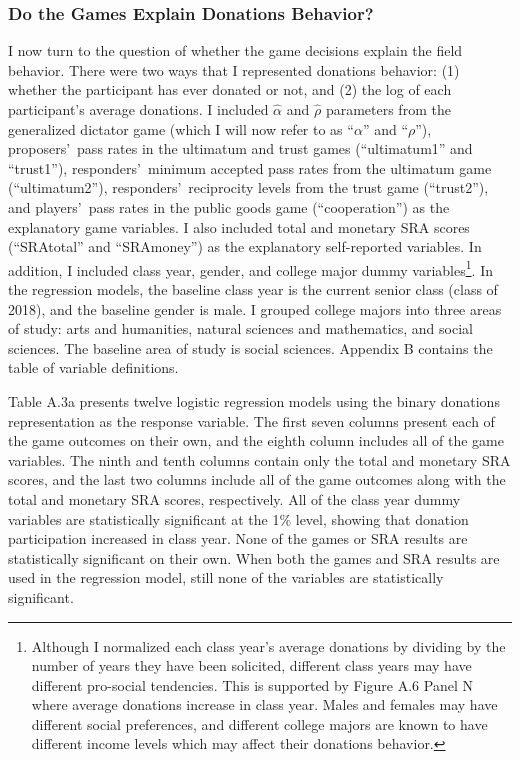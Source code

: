 \documentclass[12pt]{article}
\begin{document}
\subsubsection{Do the Games Explain Donations Behavior?}
I now turn to the question of whether the game decisions explain the field behavior. There were two ways that I represented donations behavior: (1) whether the participant has ever donated or not, and (2) the log of each participant\rq s average donations. I included \(\hat{\alpha}\) and \(\hat{\rho}\) parameters from the generalized dictator game (which I will now refer to as ``\(\alpha\)'' and ``\(\rho\)''), proposers\rq \ pass rates in the ultimatum and trust games (``ultimatum1'' and ``trust1''), responders\rq \ minimum accepted pass rates from the ultimatum game (``ultimatum2''), responders\rq \ reciprocity levels from the trust game (``trust2''), and players\rq \ pass rates in the public goods game (``cooperation'') as the explanatory game variables. I also included total and monetary SRA scores (``SRAtotal'' and ``SRAmoney'') as the explanatory self-reported variables. In addition, I included class year, gender, and college major dummy variables\footnote{Although I normalized each class year\rq s average donations by dividing by the number of years they have been solicited, different class years may have different pro-social tendencies. This is supported by Figure A.6 Panel N where average donations increase in class year. Males and females may have different social preferences, and different college majors are known to have different income levels which may affect their donations behavior.}. In the regression models, the baseline class year is the current senior class (class of 2018), and the baseline gender is male. I grouped college majors into three areas of study: arts and humanities, natural sciences and mathematics, and social sciences. The baseline area of study is social sciences. Appendix B contains the table of variable definitions. 

Table A.3a presents twelve logistic regression models using the binary donations representation as the response variable. The first seven columns present each of the game outcomes on their own, and the eighth column includes all of the game variables. The ninth and tenth columns contain only the total and monetary SRA scores, and the last two columns include all of the game outcomes along with the total and monetary SRA scores, respectively. All of the class year dummy variables are statistically significant at the 1\% level, showing that donation participation increased in class year. None of the games or SRA results are statistically significant on their own. When both the games and SRA results are used in the regression model, still none of the variables are statistically significant. 
\end{document}
